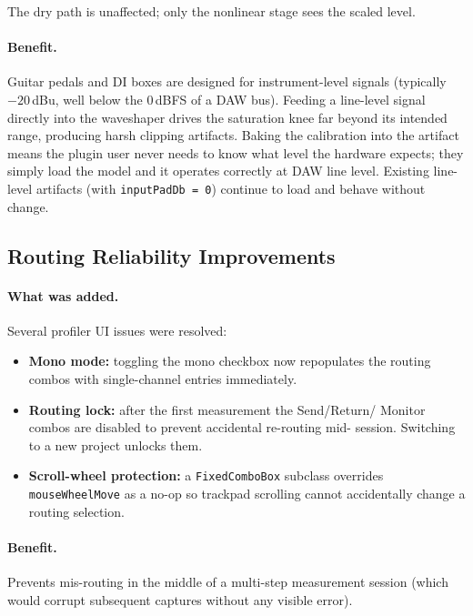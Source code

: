 \documentclass[11pt, letterpaper]{article}
\begin{document}
The dry path is unaffected; only the nonlinear stage sees the scaled level.

\paragraph{Benefit.}
Guitar pedals and DI boxes are designed for instrument-level signals (typically
$-20$\,dBu, well below the $0$\,dBFS of a DAW bus).  Feeding a line-level
signal directly into the waveshaper drives the saturation knee far beyond its
intended range, producing harsh clipping artifacts.  Baking the calibration
into the artifact means the plugin user never needs to know what level the
hardware expects; they simply load the model and it operates correctly at DAW
line level.  Existing line-level artifacts (with \texttt{inputPadDb = 0})
continue to load and behave without change.

\subsection{Routing Reliability Improvements}

\paragraph{What was added.}
Several profiler UI issues were resolved:
\begin{itemize}[leftmargin=1.5em]
    \item \textbf{Mono mode:} toggling the mono checkbox now repopulates the
          routing combos with single-channel entries immediately.
    \item \textbf{Routing lock:} after the first measurement the Send/Return/
          Monitor combos are disabled to prevent accidental re-routing mid-
          session.  Switching to a new project unlocks them.
    \item \textbf{Scroll-wheel protection:} a \texttt{FixedComboBox} subclass
          overrides \texttt{mouseWheelMove} as a no-op so trackpad scrolling
          cannot accidentally change a routing selection.
\end{itemize}

\paragraph{Benefit.}
Prevents mis-routing in the middle of a multi-step measurement session (which
would corrupt subsequent captures without any visible error).
\end{document}
